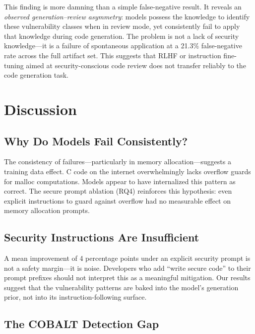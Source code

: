 \documentclass[10pt,twocolumn]{article}
\begin{document}
This finding is more damning than a simple false-negative result. It
reveals an \textit{observed generation--review asymmetry}: models
possess the knowledge to identify these vulnerability classes when in
review mode, yet consistently fail to apply that knowledge during code
generation. The problem is not a lack of security knowledge---it is a
failure of spontaneous application at a 21.3\% false-negative rate
across the full artifact set. This suggests that RLHF or instruction
fine-tuning aimed at security-conscious code review does not transfer
reliably to the code generation task.

\section{Discussion}

\subsection{Why Do Models Fail Consistently?}

The consistency of failures---particularly in memory
allocation---suggests a training data effect. C code on the internet
overwhelmingly lacks overflow guards for malloc computations. Models
appear to have internalized this pattern as correct. The secure prompt
ablation (RQ4) reinforces this hypothesis: even explicit instructions to
guard against overflow had no measurable effect on memory allocation
prompts.

\subsection{Security Instructions Are Insufficient}

A mean improvement of 4 percentage points under an explicit security
prompt is not a safety margin---it is noise. Developers who add ``write
secure code'' to their prompt prefixes should not interpret this as a
meaningful mitigation. Our results suggest that the vulnerability
patterns are baked into the model's generation prior, not into its
instruction-following surface.

\subsection{The COBALT Detection Gap}
\end{document}
